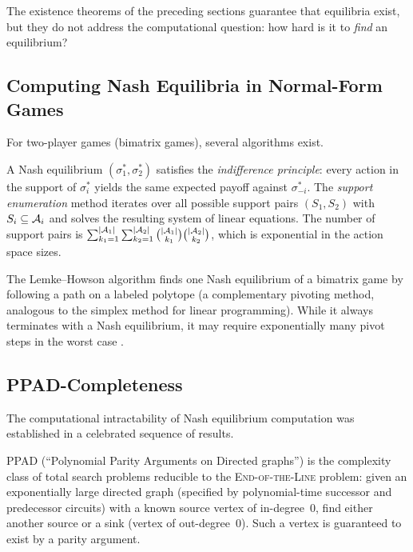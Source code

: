 \documentclass[11pt,a4paper]{article}
\begin{document}
The existence theorems of the preceding sections guarantee that
equilibria exist, but they do not address the computational question:
how hard is it to \emph{find} an equilibrium?

\subsection{Computing Nash Equilibria in Normal-Form Games}

For two-player games (bimatrix games), several algorithms exist.

\begin{definition}
\label{def:support-enum}
A Nash equilibrium $(\sigma_1^*, \sigma_2^*)$ satisfies the
\emph{indifference principle}: every action in the support of
$\sigma_i^*$ yields the same expected payoff against $\sigma_{-i}^*$.
The \emph{support enumeration} method iterates over all possible
support pairs $(S_1, S_2)$ with $S_i \subseteq \mathcal{A}_i$ and
solves the resulting system of linear equations.  The number of
support pairs is $\sum_{k_1=1}^{|\mathcal{A}_1|}
\sum_{k_2=1}^{|\mathcal{A}_2|} \binom{|\mathcal{A}_1|}{k_1}
\binom{|\mathcal{A}_2|}{k_2}$, which is exponential in the action
space sizes.
\end{definition}

\begin{remark}
The Lemke--Howson algorithm \citep{shoham2008} finds one Nash
equilibrium of a bimatrix game by following a path on a labeled
polytope (a complementary pivoting method, analogous to the simplex
method for linear programming).  While it always terminates with
a Nash equilibrium, it may require exponentially many pivot steps
in the worst case \citep{shoham2008}.
\end{remark}

\subsection{PPAD-Completeness}

The computational intractability of Nash equilibrium computation was
established in a celebrated sequence of results.

\begin{definition}
\label{def:ppad}
PPAD (``Polynomial Parity Arguments on Directed graphs'') is the
complexity class of total search problems reducible to the
\textsc{End-of-the-Line} problem: given an exponentially large
directed graph (specified by polynomial-time successor and predecessor
circuits) with a known source vertex of in-degree~0, find either
another source or a sink (vertex of out-degree~0).  Such a vertex
is guaranteed to exist by a parity argument.
\end{definition}
\end{document}
